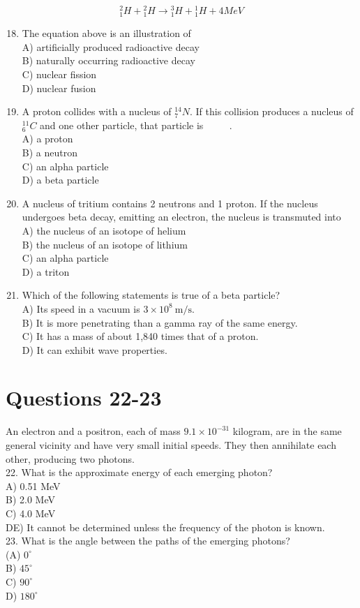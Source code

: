 \begin{enumerate}
$$
{ }_{1}^{2} H+{ }_{1}^{2} H \rightarrow{ }_{1}^{3} H+{ }_{1}^{1} H+4 M e V
$$

\begin{enumerate}
  \setcounter{enumi}{17}
  \item The equation above is an illustration of\\
A) artificially produced radioactive decay\\
B) naturally occurring radioactive decay\\
C) nuclear fission\\
D) nuclear fusion
  \item A proton collides with a nucleus of ${ }_{7}^{14} N$. If this collision produces a nucleus of ${ }_{6}^{11} C$ and one other particle, that particle is $\qquad$ .\\
A) a proton\\
B) a neutron\\
C) an alpha particle\\
D) a beta particle
  \item A nucleus of tritium contains 2 neutrons and 1 proton. If the nucleus undergoes beta decay, emitting an electron, the nucleus is transmuted into\\
A) the nucleus of an isotope of helium\\
B) the nucleus of an isotope of lithium\\
C) an alpha particle\\
D) a triton
  \item Which of the following statements is true of a beta particle?\\
A) Its speed in a vacuum is $3 \times 10^{8} \mathrm{~m} / \mathrm{s}$.\\
B) It is more penetrating than a gamma ray of the same energy.\\
C) It has a mass of about 1,840 times that of a proton.\\
D) It can exhibit wave properties.
\end{enumerate}

\section*{Questions 22-23}
An electron and a positron, each of mass $9.1 \times 10^{-31}$ kilogram, are in the same general vicinity and have very small initial speeds. They then annihilate each other, producing two photons.\\
22. What is the approximate energy of each emerging photon?\\
A) 0.51 MeV\\
B) 2.0 MeV\\
C) 4.0 MeV\\
DE) It cannot be determined unless the frequency of the photon is known.\\
23. What is the angle between the paths of the emerging photons?\\
(A) $0^{\circ}$\\
B) $45^{\circ}$\\
C) $90^{\circ}$\\
D) $180^{\circ}$


\end{enumerate}
